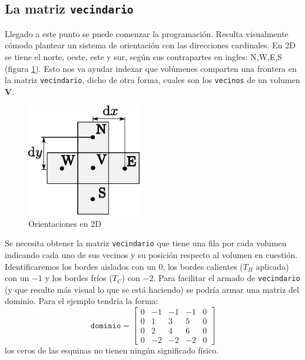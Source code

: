 \documentclass[11pt, titlepage]{article}
\begin{document}
\subsection{La matriz \texttt{vecindario}}
Llegado a este punto se puede comenzar la programación. Resulta visualmente cómodo plantear un sistema de orientación con las direcciones cardinales. En 2D se tiene el norte, oeste, este y sur, según sus contrapartes en ingles: N,W,E,S (figura \ref{fig:nsew}). Esto nos va ayudar indexar que volúmenes comparten una frontera en la matriz \texttt{vecindario}, dicho de otra forma, cuales son los \texttt{vecinos} de un volumen \textbf{V}.

\begin{figure}[htb!]
    \centering
     \includegraphics[width=5cm]{fig/nsew.eps}
    \caption{Orientaciones en 2D}
    \label{fig:nsew}
\end{figure}



Se necesita obtener la matriz \texttt{vecindario} que tiene una fila por cada volumen indicando cada uno de sus vecinos y su posición respecto al volumen en cuestión. Identificaremos los bordes aislados con un $0$, los bordes calientes ($T_H$ aplicada) con un $-1$ y los bordes fríos ($T_C$) con $-2$. Para facilitar el armado de \texttt{vecindario} (y que resulte más visual lo que se está haciendo) se podría armar una matriz del dominio. Para el ejemplo tendría la forma:
\begin{equation*}
    \texttt{dominio} = \begin{bmatrix}
    0 &-1 &-1 &-1 & 0 \\
    0 & 1 & 3 & 5 & 0 \\
    0 & 2 & 4 & 6 & 0 \\
    0 & -2 & -2 &-2 &0
    \end{bmatrix}
\end{equation*}
los ceros de las esquinas no tienen ningún significado físico.
\end{document}
